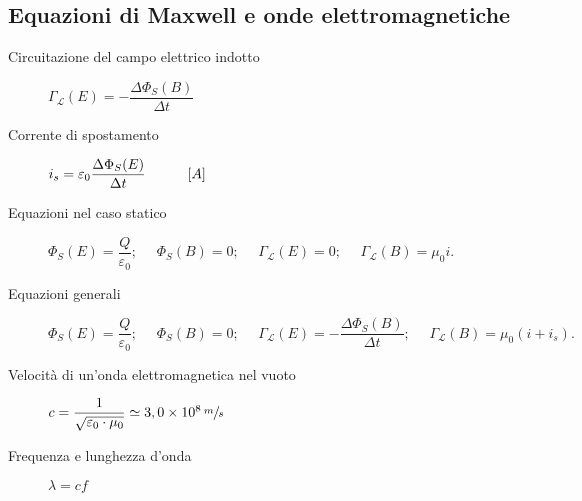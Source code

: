 \documentclass[a4paper,11pt,italian]{article}
\begin{document}
\subsection{Equazioni di Maxwell e onde elettromagnetiche}

\begin{description}
  \item[Circuitazione del campo elettrico indotto] 
  $ \Gamma_\mathscr{L}(E) = - \dfrac{\Delta \Phi_S(B)}{\Delta t}  $
  
  \item[Corrente di spostamento] 
  $ i_s = \varepsilon_0 \dfrac{\Delta \Phi_S(E)}{\Delta t} \hspace*{3em} [A]$
  
  \item[Equazioni nel caso statico] $ \Phi_S(E) = \dfrac{Q}{\varepsilon_0}; ~~~~~~ \Phi_S(B) = 0; ~~~~~~ \Gamma_\mathscr{L}(E) = 0; ~~~~~~ \Gamma_\mathscr{L}(B) = \mu_0 i.$

  \item[Equazioni generali] $ \Phi_S(E) = \dfrac{Q}{\varepsilon_0}; ~~~~~~ \Phi_S(B) = 0; ~~~~~~ \Gamma_\mathscr{L}(E) = - \dfrac{\Delta\Phi_S(B)}{\Delta t}; ~~~~~~ \Gamma_\mathscr{L}(B) = \mu_0 \left( i + i_s \right) .$

  
%   
  
  \item[Velocità di un'onda elettromagnetica nel vuoto] 
  $ c = \dfrac{1}{\sqrt{\varepsilon_0\cdot \mu_0}} \simeq 3,0 \times 10^8 \,	\sfrac{m}{s} $
  
   \item[Frequenza e lunghezza d'onda] 

$ \lambda = c f $
%
% 
  

\end{description}
\end{document}
